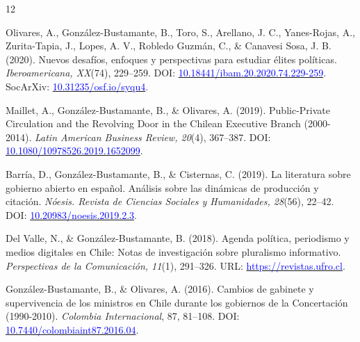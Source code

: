 \begin{publications}
\begin{benumerate}{12}
\item{Olivares, A., González-Bustamante, B., Toro, S., Arellano, J. C., Yanes-Rojas, A., Zurita-Tapia, J., Lopes, A. V., Robledo Guzmán, C., \& Canavesi Sosa, J. B. (2020). Nuevos desafíos, enfoques y perspectivas para estudiar élites políticas. {\itshape Iberoamericana, XX}(74), 229--259. DOI: \href{https://doi.org/10.18441/ibam.20.2020.74.229-259}{\textcolor{blue}{10.18441/ibam.20.2020.74.229-259}}. SocArXiv: \href{https://doi.org/10.31235/osf.io/syqu4}{\textcolor{blue}{10.31235/osf.io/syqu4}}.}\vspace{1mm}

\item{Maillet, A., González-Bustamante, B., \& Olivares, A. (2019). Public-Private Circulation and the Revolving Door in the Chilean Executive Branch (2000-2014). {\itshape Latin American Business Review, 20}(4), 367--387. DOI: \\ \href{https://doi.org/10.1080/10978526.2019.1652099}{\textcolor{blue}{10.1080/10978526.2019.1652099}}.}\vspace{1mm}

\item{Barría, D., González-Bustamante, B., \& Cisternas, C. (2019). La literatura sobre gobierno abierto en español. Análisis sobre las dinámicas de producción y citación. {\itshape Nóesis. Revista de Ciencias Sociales y Humanidades, 28}(56), 22--42. DOI: \href{http://dx.doi.org/10.20983/noesis.2019.2.3}{\textcolor{blue}{10.20983/noesis.2019.2.3}}.}\vspace{1mm}

\item{Del Valle, N., \& González-Bustamante, B. (2018). Agenda política, periodismo y medios digitales en Chile: Notas de investigación sobre pluralismo informativo. {\itshape Perspectivas de la Comunicación, 11}(1), 291--326. URL: \href{https://revistas.ufro.cl/ojs/index.php/perspectivas/article/view/1146}{\textcolor{blue}{https://revistas.ufro.cl}}.}\vspace{1mm}

\item{González-Bustamante, B., \& Olivares, A. (2016). Cambios de gabinete y supervivencia de los ministros en Chile durante los gobiernos de la Concertación (1990-2010). {\itshape Colombia Internacional}, 87, 81--108. DOI: \\ \href{https://doi.org/10.7440/colombiaint87.2016.04}{\textcolor{blue}{10.7440/colombiaint87.2016.04}}.}\vspace{1mm}


\end{benumerate}
\end{publications}
